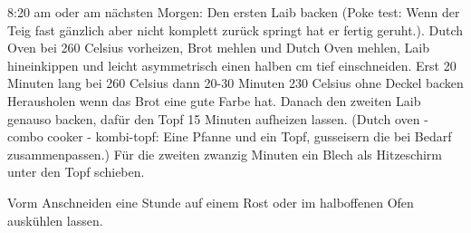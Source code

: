 { 8:20 am oder am nächsten Morgen: Den ersten Laib backen (Poke test: Wenn der Teig fast gänzlich aber nicht komplett zurück springt hat er fertig geruht.). Dutch Oven bei 260 Celsius vorheizen, Brot mehlen und Dutch Oven mehlen, Laib hineinkippen und leicht asymmetrisch einen halben cm tief einschneiden. Erst 20 Minuten lang bei 260 Celsius dann 20-30 Minuten 230 Celsius ohne Deckel backen Herausholen wenn das Brot eine gute Farbe hat. Danach den zweiten Laib genauso backen, dafür den Topf 15 Minuten aufheizen lassen. (Dutch oven - combo cooker - kombi-topf: Eine Pfanne
 und ein Topf, gusseisern die bei Bedarf zusammenpassen.)
Für die zweiten zwanzig Minuten ein Blech als Hitzeschirm unter den Topf schieben.

Vorm Anschneiden eine Stunde auf einem Rost oder im halboffenen Ofen auskühlen lassen. }


